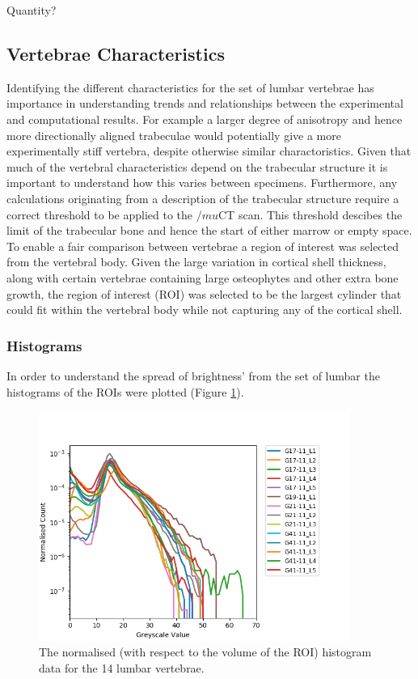 Quantity?

\subsection{Vertebrae Characteristics}

Identifying the different characteristics for the set of lumbar vertebrae has
importance in understanding trends and relationships between the experimental and
computational results.
For example a larger degree of anisotropy and hence more directionally aligned
trabeculae would potentially give a more experimentally stiff vertebra, despite
otherwise similar charactoristics.
Given that much of the vertebral characteristics depend on the trabecular
structure it is important to understand how this varies between specimens.
Furthermore, any calculations originating from a description of the trabecular
structure require a correct threshold to be applied to the $/mu$CT scan.
This threshold descibes the limit of the trabecular bone and hence the start of
either marrow or empty space.
To enable a fair comparison between vertebrae a region of interest was selected
from the vertebral body.
Given the large variation in cortical shell thickness, along with certain
vertebrae containing large osteophytes and other extra bone growth, the region of
interest (ROI) was selected to be the largest cylinder that could fit within the
vertebral body while not capturing any of the cortical shell.

\subsubsection{Histograms}

In order to understand the spread of brightness' from the set of lumbar the
histograms of the ROIs were plotted (Figure \ref{fig:normalisedhistogram}).

\begin{figure}[ht]
\centering
\includegraphics[width=4in]{Chapters/Chapter_HT_images/Normalised_Histogram.png}
\caption{The normalised (with respect to the volume of the ROI) histogram data
  for the 14 lumbar vertebrae.}
\label{fig:normalisedhistogram}
\end{figure}

